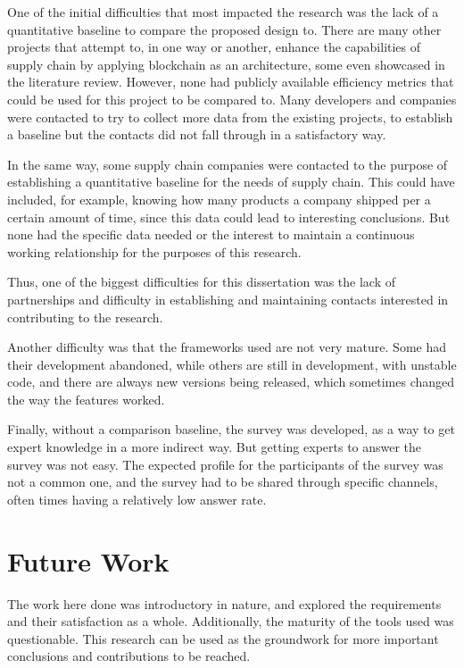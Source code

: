 One of the initial difficulties that most impacted the research was the lack of a quantitative baseline to compare the proposed design to. There are many other projects that attempt to, in one way or another, enhance the capabilities of supply chain by applying blockchain as an architecture, some even showcased in the literature review. However, none had publicly available efficiency metrics that could be used for this project to be compared to. Many developers and companies were contacted to try to collect more data from the existing projects, to establish a baseline but the contacts did not fall through in a satisfactory way. 

In the same way, some supply chain companies were contacted to the purpose of establishing a quantitative baseline for the needs of supply chain. This could have included, for example, knowing how many products a company shipped per a certain amount of time, since this data could lead to interesting conclusions. But none had the specific data needed or the interest to maintain a continuous working relationship for the purposes of this research.

Thus, one of the biggest difficulties for this dissertation was the lack of partnerships and difficulty in establishing and maintaining contacts interested in contributing to the research. %

Another difficulty was that the frameworks used are not very mature. Some had their development abandoned, while others are still in development, with unstable code, and there are always new versions being released, which sometimes changed the way the features worked.

Finally, without a comparison baseline, the survey was developed, as a way to get expert knowledge in a more indirect way. But getting experts to answer the survey was not easy. The expected profile for the participants of the survey was not a common one, and the survey had to be shared through specific channels, often times having a relatively low answer rate.

\section{Future Work}

The work here done was introductory in nature, and explored the requirements and their satisfaction as a whole. Additionally, the maturity of the tools used was questionable. This research can be used as the groundwork for more important conclusions and contributions to be reached.

